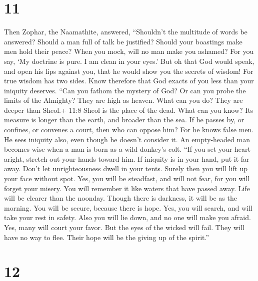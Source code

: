 \hypertarget{section-8}{%
\section{11}\label{section-8}}

 Then Zophar, the Naamathite, answered, 
``Shouldn't the multitude of words be answered? Should a man full of
talk be justified?  Should your boastings make men hold
their peace? When you mock, will no man make you ashamed? 
For you say, `My doctrine is pure. I am clean in your eyes.'
 But oh that God would speak, and open his lips against you,
 that he would show you the secrets of wisdom! For true
wisdom has two sides. Know therefore that God exacts of you less than
your iniquity deserves.  ``Can you fathom the mystery of
God? Or can you probe the limits of the Almighty?  They are
high as heaven. What can you do? They are deeper than Sheol.+ 11:8 Sheol
is the place of the dead. What can you know?  Its measure is
longer than the earth, and broader than the sea.  If he
passes by, or confines, or convenes a court, then who can oppose him?
 For he knows false men. He sees iniquity also, even though
he doesn't consider it.  An empty-headed man becomes wise
when a man is born as a wild donkey's colt.  ``If you set
your heart aright, stretch out your hands toward him.  If
iniquity is in your hand, put it far away. Don't let unrighteousness
dwell in your tents.  Surely then you will lift up your
face without spot. Yes, you will be steadfast, and will not fear,
 for you will forget your misery. You will remember it like
waters that have passed away.  Life will be clearer than
the noonday. Though there is darkness, it will be as the morning.
 You will be secure, because there is hope. Yes, you will
search, and will take your rest in safety.  Also you will
lie down, and no one will make you afraid. Yes, many will court your
favor.  But the eyes of the wicked will fail. They will
have no way to flee. Their hope will be the giving up of the spirit.''

\hypertarget{section-9}{%
\section{12}\label{section-9}}

